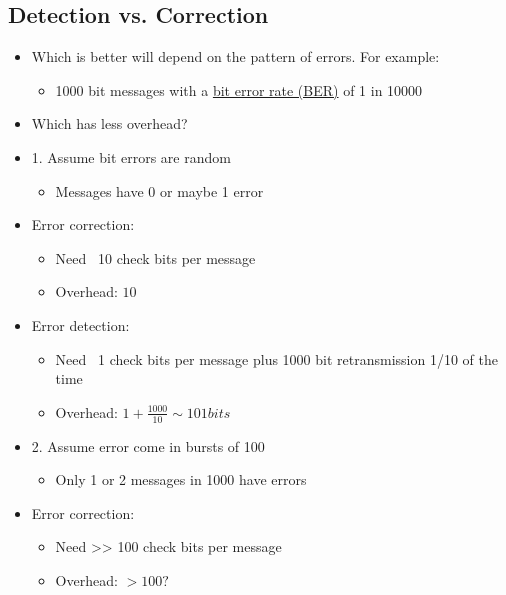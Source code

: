 \documentclass[12pt]{ctexart}   %
\begin{document}
	\subsection{Detection vs. Correction}
	\begin{itemize}
		\item Which is better will depend on the pattern of errors. For example:
		\begin{itemize}
			\item 1000 bit messages with a \underline{bit error rate (BER)} of 1 in 10000
		\end{itemize}
		
		\item Which has less overhead?
		
		\item {\color{blue} 1.} Assume bit errors are random
		\begin{itemize}
			\item Messages have 0 or maybe 1 error
		\end{itemize}
		
		\item Error correction:
		\begin{itemize}
			\item Need ~10 check bits per message
			\item Overhead: $ 10 $
		\end{itemize}
		
		\item Error detection:
		\begin{itemize}
			\item Need ~1 check bits per message plus 1000 bit retransmission 1/10 of the time
			\item Overhead: $ 1 + \frac{1000}{10} \sim 101 bits $
		\end{itemize}
		
		\item {\color{blue} 2.} Assume error come in bursts of 100
		\begin{itemize}
			\item Only 1 or 2 messages in 1000 have errors
		\end{itemize}
		
		\item Error correction:
		\begin{itemize}
			\item Need >> 100 check bits per message
			\item Overhead: $ >100?$
		\end{itemize}
		

\end{itemize}
\end{document}

